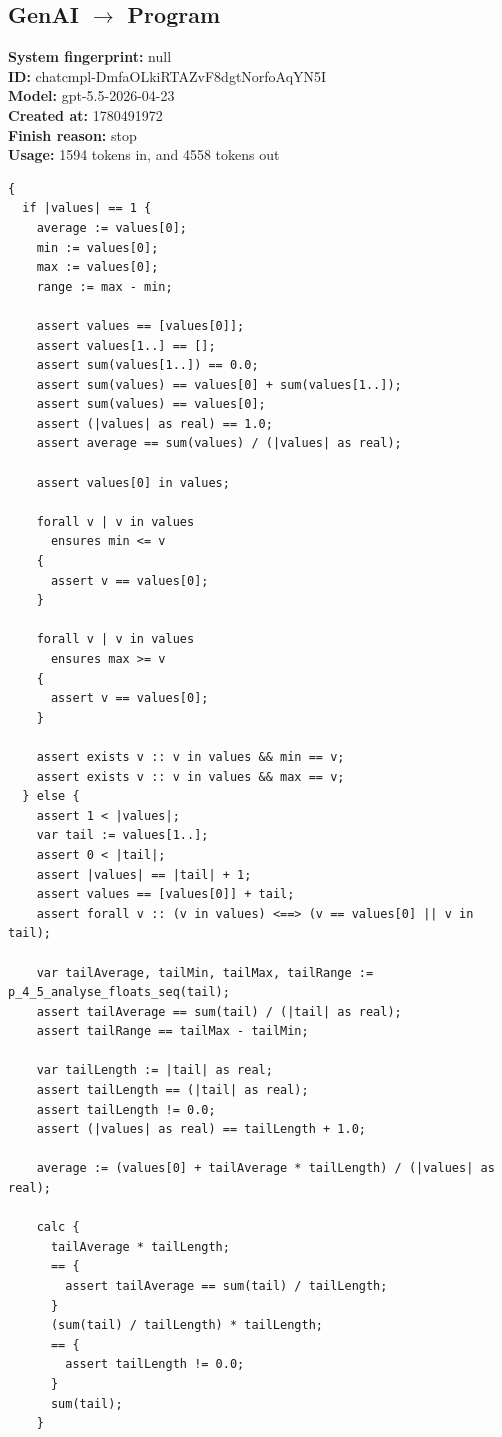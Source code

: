 \documentclass{article}
\begin{document}
\subsection*{GenAI $\rightarrow$ Program}
\textbf{System fingerprint: }null
\\\textbf{ID: }chatcmpl-DmfaOLkiRTAZvF8dgtNorfoAqYN5I
\\\textbf{Model: }gpt-5.5-2026-04-23
\\\textbf{Created at: }1780491972
\\\textbf{Finish reason: }stop
\\\textbf{Usage: }1594 tokens in, and 4558 tokens out
\begin{lstlisting}
{
  if |values| == 1 {
    average := values[0];
    min := values[0];
    max := values[0];
    range := max - min;

    assert values == [values[0]];
    assert values[1..] == [];
    assert sum(values[1..]) == 0.0;
    assert sum(values) == values[0] + sum(values[1..]);
    assert sum(values) == values[0];
    assert (|values| as real) == 1.0;
    assert average == sum(values) / (|values| as real);

    assert values[0] in values;

    forall v | v in values
      ensures min <= v
    {
      assert v == values[0];
    }

    forall v | v in values
      ensures max >= v
    {
      assert v == values[0];
    }

    assert exists v :: v in values && min == v;
    assert exists v :: v in values && max == v;
  } else {
    assert 1 < |values|;
    var tail := values[1..];
    assert 0 < |tail|;
    assert |values| == |tail| + 1;
    assert values == [values[0]] + tail;
    assert forall v :: (v in values) <==> (v == values[0] || v in tail);

    var tailAverage, tailMin, tailMax, tailRange := p_4_5_analyse_floats_seq(tail);
    assert tailAverage == sum(tail) / (|tail| as real);
    assert tailRange == tailMax - tailMin;

    var tailLength := |tail| as real;
    assert tailLength == (|tail| as real);
    assert tailLength != 0.0;
    assert (|values| as real) == tailLength + 1.0;

    average := (values[0] + tailAverage * tailLength) / (|values| as real);

    calc {
      tailAverage * tailLength;
      == {
        assert tailAverage == sum(tail) / tailLength;
      }
      (sum(tail) / tailLength) * tailLength;
      == {
        assert tailLength != 0.0;
      }
      sum(tail);
    }


\end{lstlisting}
\end{document}
